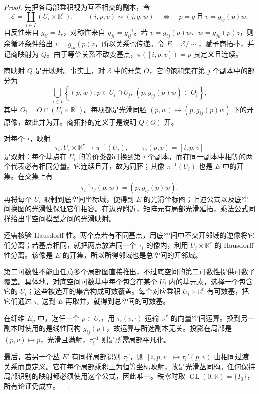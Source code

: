 \begin{proof}
	先把各局部乘积视为互不相交的副本，令
	\[
		\mathcal E=\coprod_{i\in I}(U_i\times\mathbb R^r),\qquad
		(i,p,v)\sim(j,q,w)
		\quad\Longleftrightarrow\quad
		p=q\ \text{且}\ v=g_{ij}(p)w.
	\]
	自反性来自 \(g_{ii}=I_r\)，对称性来自 \(g_{ji}=g_{ij}^{-1}\)。若 \(v=g_{ij}(p)w\)、\(w=g_{jk}(p)z\)，则余循环条件给出 \(v=g_{ik}(p)z\)，所以关系也传递。令 \(E=\mathcal E/\!\sim\)，赋予商拓扑，并记商映射为 \(Q\)。由于等价关系不改变基点，\(\pi([i,p,v])=p\) 良定义且连续。

	商映射 \(Q\) 是开映射。事实上，对 \(\mathcal E\) 中的开集 \(O\)，它的饱和集在第 \(j\) 个副本中的部分为
	\[
		\bigcup_{i\in I}\left\{(p,w):p\in U_i\cap U_j,\ (p,g_{ij}(p)w)\in O_i\right\},
	\]
	其中 \(O_i=O\cap(U_i\times\mathbb R^r)\)。每项都是光滑同胚 \((p,w)\mapsto(p,g_{ij}(p)w)\) 下的开原像，故此并为开。商拓扑的定义于是说明 \(Q(O)\) 开。

	对每个 \(i\)，映射
	\[
		\tau_i:U_i\times\mathbb R^r\longrightarrow\pi^{-1}(U_i),
		\qquad\tau_i(p,v)=[i,p,v]
	\]
	是双射：每个基点在 \(U_i\) 的等价类都可换到第 \(i\) 个副本，而在同一副本中相等的两个代表必有相同分量。它连续且开，故为同胚；其像 \(\pi^{-1}(U_i)\) 也是 \(E\) 中的开集。在交集上有
	\[
		\tau_i^{-1}\tau_j(p,w)=(p,g_{ij}(p)w).
	\]
	再将每个 \(U_i\) 限制到底空间坐标域，便得到 \(E\) 的光滑坐标图；上述公式以及底空间换图的光滑性保证它们相容。在边界附近，矩阵元有局部光滑延拓，乘法公式同样给出半空间模型之间的光滑映射。

	还需核验 Hausdorff 性。两个点若有不同基点，用底空间中不交开邻域的逆像将它们分离；若基点相同，就把两点放进同一个 \(\tau_i\) 的像内，利用 \(U_i\times\mathbb R^r\) 的 Hausdorff 性分离。该像是 \(E\) 的开集，所以所得邻域也是总空间的开邻域。

	第二可数性不能由任意多个局部图直接推出，不过底空间的第二可数性提供可数子覆盖。具体地，对底空间可数基中每个包含在某个 \(U_i\) 内的基元素，选择一个包含它的 \(U_i\)；这些被选开的集合构成可数覆盖。每个对应乘积 \(U_i\times\mathbb R^r\) 有可数基，把它们通过 \(\tau_i\) 送到 \(E\) 再取并，就得到总空间的可数基。

	在纤维 \(E_p\) 中，选任一个 \(p\in U_i\)，用 \(\tau_i(p,\cdot)\) 运输 \(\mathbb R^r\) 的向量空间运算。换到另一副本时使用的是线性同构 \(g_{ij}(p)\)，故运算与所选副本无关。投影在局部是 \((p,v)\mapsto p\)，光滑且满射，\(\tau_i^{-1}\) 则是所需局部平凡化。

	最后，若另一个丛 \(E'\) 有同样局部识别 \(\tau_i'\)，则 \([i,p,v]\mapsto\tau_i'(p,v)\) 由相同过渡关系而良定义。它在每个局部乘积上为恒等坐标映射，故是光滑丛同构。任何保持局部识别的映射都必须使用这个公式，因此唯一。秩零时取 \(\operatorname{GL}(0,\mathbb R)=\{I_0\}\)，所有论证仍成立。
\end{proof}

